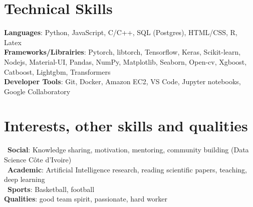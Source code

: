 \documentclass[letterpaper,11pt]{article}
\begin{document}
\section{\textbf{Technical Skills} \faLinux \ \faWindows \ \faApple\ \faLanguage}
 \begin{itemize}[leftmargin=0.15in, label={}]
    \small{\item{
        \textbf{Languages}{: Python, JavaScript, C/C++, SQL (Postgres), HTML/CSS, R, Latex} \\
        \textbf{Frameworks/Librairies}{: Pytorch, libtorch, Tensorflow, Keras, Scikit-learn, Nodejs, Material-UI, Pandas, NumPy, Matplotlib, Seaborn, Open-cv, Xgboost, Catboost, Lightgbm, Transformers} \\
        \textbf{Developer Tools}{: Git, Docker, Amazon EC2, VS Code, Jupyter notebooks, Google Collaboratory} \\
    }}
 \end{itemize}

%
\section{\textbf{Interests, other skills and qualities} \faStar}
\begin{itemize}[leftmargin=0.15in, label={}]
    \small{\item{
        \faGroup \ \textbf{Social}{: Knowledge sharing, motivation, mentoring, community building (Data Science Côte d'Ivoire)} \\
        \faBook \ \textbf{Academic}{: Artificial Intelligence research, reading scientific papers, teaching, deep learning} \\
        \faSoccerBallO \ \textbf{Sports}{: Basketball, football} \\
        \textbf{Qualities}{: good team spirit, passionate, hard worker} \\

    }}
 \end{itemize}


\end{document}
